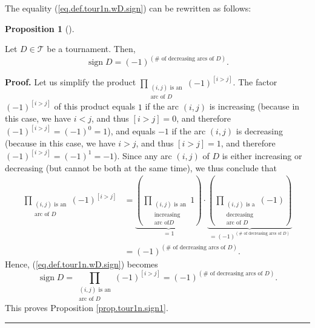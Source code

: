 \documentclass[numbers=enddot,12pt,final,onecolumn,notitlepage]{scrartcl}%
\numberwithin{exer}{subsection}
\theoremstyle{definition}
\newtheorem{prop}[theo]{Proposition}
\newenvironment{proposition}[1][]
{\begin{prop}[#1]\begin{leftbar}}
{\end{leftbar}\end{prop}}
\newenvironment{proof}[1][Proof]{\noindent\textbf{#1.} }{\ \rule{0.5em}{0.5em}}
\let\prodnonlimits\prod
\renewcommand{\prod}{\prodnonlimits\limits}
\begin{document}
The equality (\ref{eq.def.tour1n.wD.sign}) can be rewritten as follows:

\begin{proposition}
\label{prop.tour1n.sign1}Let $D\in\mathcal{T}$ be a tournament. Then,%
\[
\operatorname*{sign}D=\left(  -1\right)  ^{\left(  \#\text{ of decreasing arcs
of }D\right)  }.
\]

\end{proposition}

\begin{proof}
Let us simplify the product $\prod_{\substack{\left(  i,j\right)  \text{ is
an}\\\text{arc of }D}}\left(  -1\right)  ^{\left[  i>j\right]  }$. The factor
$\left(  -1\right)  ^{\left[  i>j\right]  }$ of this product equals $1$ if the
arc $\left(  i,j\right)  $ is increasing (because in this case, we have $i<j$,
and thus $\left[  i>j\right]  =0$, and therefore $\left(  -1\right)  ^{\left[
i>j\right]  }=\left(  -1\right)  ^{0}=1$), and equals $-1$ if the arc $\left(
i,j\right)  $ is decreasing (because in this case, we have $i>j$, and thus
$\left[  i>j\right]  =1$, and therefore $\left(  -1\right)  ^{\left[
i>j\right]  }=\left(  -1\right)  ^{1}=-1$). Since any arc $\left(  i,j\right)
$ of $D$ is either increasing or decreasing (but cannot be both at the same
time), we thus conclude that%
\begin{align*}
\prod_{\substack{\left(  i,j\right)  \text{ is an}\\\text{arc of }D}}\left(
-1\right)  ^{\left[  i>j\right]  }  &  =\underbrace{\left(  \prod
_{\substack{\left(  i,j\right)  \text{ is an}\\\text{increasing}\\\text{arc of
}D}}1\right)  }_{=1}\cdot\underbrace{\left(  \prod_{\substack{\left(
i,j\right)  \text{ is a}\\\text{decreasing}\\\text{arc of }D}}\left(
-1\right)  \right)  }_{=\left(  -1\right)  ^{\left(  \#\text{ of decreasing
arcs of }D\right)  }}\\
&  =\left(  -1\right)  ^{\left(  \#\text{ of decreasing arcs of }D\right)  }.
\end{align*}
Hence, (\ref{eq.def.tour1n.wD.sign}) becomes%
\[
\operatorname*{sign}D=\prod_{\substack{\left(  i,j\right)  \text{ is
an}\\\text{arc of }D}}\left(  -1\right)  ^{\left[  i>j\right]  }=\left(
-1\right)  ^{\left(  \#\text{ of decreasing arcs of }D\right)  }.
\]
This proves Proposition \ref{prop.tour1n.sign1}.
\end{proof}
\end{document}
